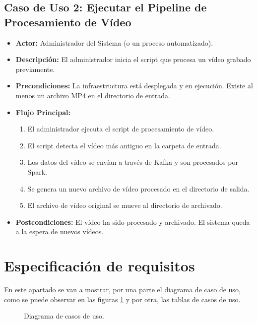 \subsection{Caso de Uso 2: Ejecutar el Pipeline de Procesamiento de Vídeo}
\begin{itemize}
    \item \textbf{Actor:} Administrador del Sistema (o un proceso automatizado).
    \item \textbf{Descripción:} El administrador inicia el script que procesa un vídeo grabado previamente.
    \item \textbf{Precondiciones:} La infraestructura está desplegada y en ejecución. Existe al menos un archivo MP4 en el directorio de entrada.
    \item \textbf{Flujo Principal:}
        \begin{enumerate}
            \item El administrador ejecuta el script de procesamiento de vídeo.
            \item El script detecta el vídeo más antiguo en la carpeta de entrada.
            \item Los datos del vídeo se envían a través de Kafka y son procesados por Spark.
            \item Se genera un nuevo archivo de vídeo procesado en el directorio de salida.
            \item El archivo de vídeo original se mueve al directorio de archivado.
        \end{enumerate}
    \item \textbf{Postcondiciones:} El vídeo ha sido procesado y archivado. El sistema queda a la espera de nuevos vídeos.
\end{itemize}

\section{Especificación de requisitos}
En este apartado se van a mostrar, por una parte el diagrama de caso de uso, como se puede observar en las figuras  \ref{f:casoUso} y por otra, las tablas de casos de uso.


\begin{figure}[H]
 \centering
{}
 \caption{Diagrama de casos de uso.}
 \label{f:casoUso}
\end{figure}


